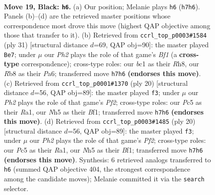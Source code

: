 \documentclass[11pt]{article}
\begin{document}
\clearpage

\begin{figure}[p]\centering
\begin{subfigure}{0.46\textwidth}\centering
\resizebox{\linewidth}{!}{%
\newchessgame
\chessboard[
  setfen={1rb2r2/pp4kp/6p1/2pBbp1n/7P/N3P1P1/PP1PKP2/R1B1R3 b - - 4 19},
  showmover=false,
  pgfstyle=straightmove, color=movearrow, markmove={h7-h6}
]}
\caption{}
\end{subfigure}\hfill
\begin{subfigure}{0.46\textwidth}\centering
\resizebox{\linewidth}{!}{%
\newchessgame
\chessboard[
  setfen={4kb1r/r4pp1/p1bppn1p/1p6/4P1P1/3B1P2/PPPBN2P/1K1R3R b k - 1 16},
  showmover=false,
  pgfstyle=straightmove, color=movearrow, markmove={f8-e7}
]}
\caption{}
\end{subfigure}
\\[4pt]
\begin{subfigure}{0.46\textwidth}\centering
\resizebox{\linewidth}{!}{%
\newchessgame
\chessboard[
  setfen={r3kbnr/1b1p1ppp/p3p3/1p6/3BP3/2N3P1/PPP2PP1/R3KB1R w KQkq - 1 11},
  showmover=false,
  pgfstyle=straightmove, color=movearrow, markmove={f2-f3}
]}
\caption{}
\end{subfigure}\hfill
\begin{subfigure}{0.46\textwidth}\centering
\resizebox{\linewidth}{!}{%
\newchessgame
\chessboard[
  setfen={r3kbnr/1b1p1ppp/p3p3/1p6/3BP3/2N3P1/PPP2PP1/R3KB1R w KQkq - 1 11},
  showmover=false,
  pgfstyle=straightmove, color=movearrow, markmove={f2-f3}
]}
\caption{}
\end{subfigure}
\caption{\textbf{Move 19, Black: \texttt{h6}.} (a) Our position; Melanie plays \texttt{h6} (\texttt{h7h6}). Panels (b)--(d) are the retrieved master positions whose correspondence most drove this move (highest QAP objective among those that transfer to it). (b) Retrieved from \texttt{ccrl\_top\_p0003\#1584} (ply 31) [structural distance $d$=69, QAP obj=90]: the master played \texttt{Be7}; under $\mu$ our \emph{Ph2} plays the role of that game's \emph{Bf1} (a \textbf{cross-type} correspondence); cross-type roles: our \emph{b}c1 as their \emph{R}h8, our \emph{R}b8 as their \emph{P}a6; transferred move \texttt{h7h6} \textbf{(endorses this move)}. (c) Retrieved from \texttt{ccrl\_top\_p0001\#1370} (ply 20) [structural distance $d$=56, QAP obj=89]: the master played \texttt{f3}; under $\mu$ our \emph{Ph2} plays the role of that game's \emph{Pf2}; cross-type roles: our \emph{P}c5 as their \emph{R}a1, our \emph{N}h5 as their \emph{B}f1; transferred move \texttt{h7h6} \textbf{(endorses this move)}. (d) Retrieved from \texttt{ccrl\_top\_p0003\#1485} (ply 20) [structural distance $d$=56, QAP obj=89]: the master played \texttt{f3}; under $\mu$ our \emph{Ph2} plays the role of that game's \emph{Pf2}; cross-type roles: our \emph{P}c5 as their \emph{R}a1, our \emph{N}h5 as their \emph{B}f1; transferred move \texttt{h7h6} \textbf{(endorses this move)}. Synthesis: 6 retrieved analogs transferred to \texttt{h6} (summed QAP objective 404, the strongest correspondence among the candidate moves); Melanie committed it via the \texttt{search} selector.}
\label{fig:thought-m37}
\end{figure}
\end{document}
